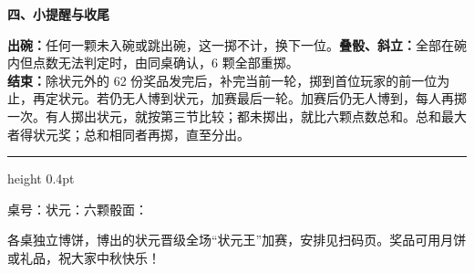 \documentclass[11pt,a4paper,fontset=none]{ctexart}
\newcommand{\shead}[2]{\par\vspace{7pt}%
  {\fontsize{12.5}{17}\selectfont\bfseries\sffamily
  #1、#2\hspace{10pt}{\color{rulegray}\leaders\hrule height 0.3pt\hfill}\kern0pt\par}\vspace{4pt}}
\begin{document}
\shead{四}{小提醒与收尾}
\textbf{出碗：}任何一颗未入碗或跳出碗，这一掷不计，换下一位。\textbf{叠骰、斜立：}全部在碗内但点数无法判定时，由同桌确认，6 颗全部重掷。\\
\textbf{结束：}除状元外的 62 份奖品发完后，补完当前一轮，掷到首位玩家的前一位为止，再定状元。若仍无人博到状元，加赛最后一轮。加赛后仍无人博到，每人再掷一次。有人掷出状元，就按第三节比较；都未掷出，就比六颗点数总和。总和最大者得状元奖；总和相同者再掷，直至分出。

\vspace{7pt}\hrule height 0.4pt\vspace{5pt}
{\fontsize{10}{15}\selectfont
桌号：\underline{\hspace{1.2cm}}\quad 状元：\underline{\hspace{2.4cm}}\quad 六颗骰面：\underline{\hspace{3.4cm}}\par}
\vspace{3pt}
{\fontsize{9}{12}\selectfont 各桌独立博饼，博出的状元晋级全场“状元王”加赛，安排见扫码页。奖品可用月饼或礼品，祝大家中秋快乐！\par}
\end{document}
